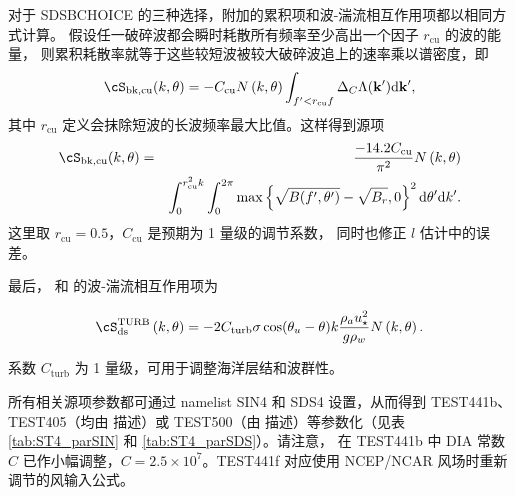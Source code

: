 对于 {\F SDSBCHOICE} 的三种选择，附加的累积项和波-湍流相互作用项都以相同方式计算。
假设任一破碎波都会瞬时耗散所有频率至少高出一个因子 $r_{\mathrm{cu}}$ 的波的能量，
则累积耗散率就等于这些较短波被较大破碎波追上的速率乘以谱密度，即
\begin{equation}
\cS_{\mathrm{bk,cu}}(k,\theta) = -C_{\mathrm{cu}}  N \left(k,\theta\right) \int_{f' < r_{\mathrm{cu}} f } \Delta_C \Lambda(\mathbf{k'}) \mathrm{d\mathbf{k'}},
\label{Sds_cu1}
\end{equation}
其中 $r_{\mathrm{cu}}$ 定义会抹除短波的长波频率最大比值。这样得到源项
\begin{eqnarray}
\cS_{\mathrm{bk,cu}}(k,\theta) &=&  \frac{-14.2 C_{\mathrm{cu}}}{\pi^2}  N \left(k,\theta\right)
 \nonumber \\
& &\int_0^{ r^2_{\mathrm{cu}} k }\int_0^{2\pi}
\max \left\{\sqrt{B(f',\theta')}-\sqrt{B_r},0\right\}^2
\mathrm{d}\theta' \mathrm{d}k'.
\label{Sds_sat_isotropic}
\end{eqnarray}
这里取 $r_{\mathrm{cu}}=0.5$，$C_{\mathrm{cu}}$ 是预期为 1 量级的调节系数，
同时也修正 $l$ 估计中的误差。

最后，\cite{art:TB02} 和 \cite{art:AJ06} 的波-湍流相互作用项为

\begin{equation}
\cS_{\mathrm{ds}}^{\mathrm{TURB}}\left(k,\theta\right) = - 2
C_{\mathrm{turb}} \sigma \cos(\theta_u - \theta) k \frac{\rho_a
u_\star^2}{g \rho_w}  N\left(k,\theta\right) .
\end{equation}

\noindent
系数 $C_{\mathrm{turb}}$ 为 1 量级，可用于调整海洋层结和波群性。

所有相关源项参数都可通过 namelist {\F SIN4} 和 {\F SDS4} 设置，从而得到
TEST441b、TEST405（均由 \cite{art:Aea10} 描述）或 TEST500（由 \cite{art:FA12}
描述）等参数化（见表 \ref{tab:ST4_parSIN} 和 \ref{tab:ST4_parSDS}）。请注意，
在 TEST441b 中 DIA 常数 $C$ 已作小幅调整，$C=2.5\times 10^7$。TEST441f 对应使用
NCEP/NCAR 风场时重新调节的风输入公式。

